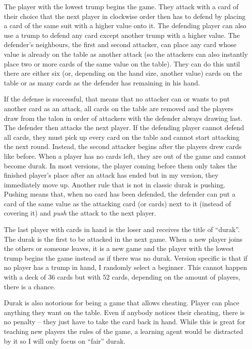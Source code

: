 \documentclass[a4paper,titlepage]{article}
\begin{document}
The player with the lowest trump begins the game. They attack with a card of their choice that the next player in clockwise order then has to defend by placing a card of the same suit with a higher value onto it. The defending player can also use a trump to defend any card except another trump with a higher value. The defender's neighbours, the first and second attacker, can place any card whose value is already on the table as another attack (so the attackers can also instantly place two or more cards of the same value on the table). They can do this until there are either six (or, depending on the hand size, another value) cards on the table or as many cards as the defender has remaining in his hand.

If the defense is successful, that means that no attacker can or wants to put another card as an attack, all cards on the table are removed and the players draw from the talon in order of attackers with the defender always drawing last. The defender then attacks the next player.
If the defending player cannot defend all cards, they must pick up every card on the table and cannot start attacking the next round. Instead, the second attacker begins after the players drew cards like before.
When a player has no cards left, they are out of the game and cannot become durak. In most versions, the player coming before them only takes the finished player's place after an attack has ended but in my version, they immediately move up.
Another rule that is not in classic durak is pushing. Pushing means that, when no card has been defended, the defender can put a card of the same value as the attacking card (or cards) next to it (instead of covering it) and \emph{push} the attack to the next player.

The last player with cards in hand is the loser and receives the title of ``durak''. The durak is the first to be attacked in the next game. When a new player joins the others or someone leaves, it is a new game and the player with the lowest trump begins the game instead as if there was no durak. Version specific is that if no player has a trump in hand, I randomly select a beginner. This cannot happen with a deck of 36 cards but with 52 cards, depending on the amount of players, there is a chance. \medskip

Durak is also notorious for being a game that allows cheating. Player can place anything they want on the table. Even if anybody notices their cheating, there is no penalty -- they just have to take the card back in hand. While this is great for teaching new players the rules of the game, a learning agent would be distracted by it so I will only focus on ``fair'' durak.
\end{document}

